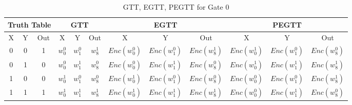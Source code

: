 \documentclass[times]{article}
\begin{document}
	\begin{table}
		\centering
		\caption{GTT, EGTT, PEGTT for Gate 0}
		\label{tab:gtt0}
		\begin{adjustbox}{width=1\textwidth}
		\begin{tabular}{|c|c|c||c|c|c||c|c|c||c|c|c|}
			\hline
			\multicolumn{3}{|c||}{Truth Table} 		& 
				\multicolumn{3}{|c||}{GTT}			& 
					\multicolumn{3}{|c||}{EGTT} 		& 
						\multicolumn{3}{|c|}{PEGTT} \\
			\hline
			\hline
			X & Y & Out	& 
				X & Y & Out	& 
					X & Y & Out	& 
						X & Y & Out	\\
			\hline
			0 & 0 & 1 	&
				$w_{0}^0$	& $w_{1}^0$	& $w_{8}^1$	& 
					$Enc(w_{0}^0)$	& $Enc(w_{1}^0)$	& $Enc(w_{8}^1)$ &
						$Enc(w_{0}^1)$	& $Enc(w_{1}^0)$	& $Enc(w_{8}^0)$ \\
			\hline
			0 & 1 & 0 	&
				$w_{0}^0$	& $w_{1}^1$	& $w_{8}^0$	& 
					$Enc(w_{0}^0)$	& $Enc(w_{1}^1)$	& $Enc(w_{8}^0)$ &
						$Enc(w_{0}^1)$	& $Enc(w_{1}^1)$	& $Enc(w_{8}^1)$ \\
			\hline
			1 & 0 & 0 	&
				$w_{0}^1$	& $w_{1}^0$	& $w_{8}^0$	& 
					$Enc(w_{0}^1)$	& $Enc(w_{1}^0)$	& $Enc(w_{8}^0)$ &
						$Enc(w_{0}^0)$	& $Enc(w_{1}^0)$	& $Enc(w_{8}^1)$ \\
			\hline
			1 & 1 & 1 	&
				$w_{0}^1$	& $w_{1}^1$	& $w_{8}^1$	& 
					$Enc(w_{0}^1)$	& $Enc(w_{1}^1)$	& $Enc(w_{8}^1)$ &
						$Enc(w_{0}^0)$	& $Enc(w_{1}^1)$	& $Enc(w_{8}^0)$ \\
			\hline
		\end{tabular}
		\end{adjustbox}
	\end{table}
\end{document}
